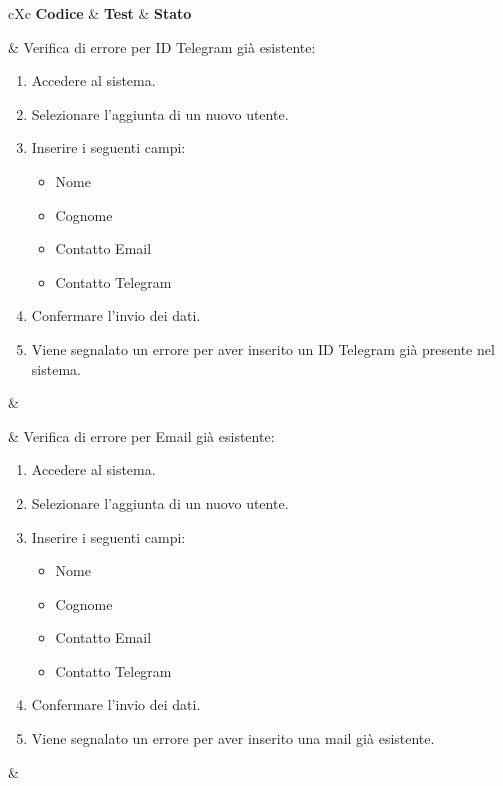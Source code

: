 \begin{table}[H]
	\begin{VTtable}[1.7]{\textwidth}{cXc}
		\rowcolor{\tablegray}
		\textbf{Codice} & \centering\textbf{Test} & \textbf{Stato} \\\toprule

         \addtotv & Verifica di errore per ID Telegram già esistente:
         \begin{enumerate}
             \item Accedere al sistema.
             \item Selezionare l'aggiunta di un nuovo utente.
             \item Inserire i seguenti campi:
             \begin{itemize}
                 \item Nome
                 \item Cognome
                 \item Contatto Email
                 \item Contatto Telegram
             \end{itemize}
             \item Confermare l'invio dei dati.
             \item Viene segnalato un errore per aver inserito un ID Telegram già presente nel sistema.
         \end{enumerate}
         & \TNI \\\midrule

        \addtotv & Verifica di errore per Email già esistente:
        \begin{enumerate}
            \item Accedere al sistema.
            \item Selezionare l'aggiunta di un nuovo utente.
            \item Inserire i seguenti campi:
            \begin{itemize}
                \item Nome
                \item Cognome
                \item Contatto Email
                \item Contatto Telegram
            \end{itemize}
            \item Confermare l'invio dei dati.
            \item Viene segnalato un errore per aver inserito una mail già esistente.
        \end{enumerate}
        & \TNI \\\midrule


\end{VTtable}
\end{table}
